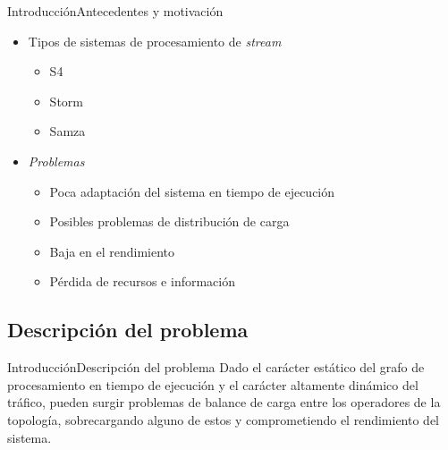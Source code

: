 \begin{frame}{Introducción}{Antecedentes y motivación}
\begin{itemize}
\item Tipos de sistemas de procesamiento de \textsl{stream}
	\begin{itemize}
	\item S4
	\item Storm
	\item Samza
	\end{itemize}
\item \textsl{Problemas}
	\begin{itemize}
	\item Poca adaptaci\'on del sistema en tiempo de ejecución
	\item Posibles problemas de distribución de carga
	\item Baja en el rendimiento
	\item Pérdida de recursos e información
	\end{itemize}
\end{itemize}
\end{frame}

\subsection*{Descripción del problema}

\begin{frame}{Introducción}{Descripción del problema}
Dado el carácter estático del grafo de procesamiento en tiempo de ejecución y el carácter altamente dinámico del tráfico, pueden surgir problemas de balance de carga entre los operadores de la topología, sobrecargando alguno de estos y comprometiendo el rendimiento del sistema.
\end{frame}